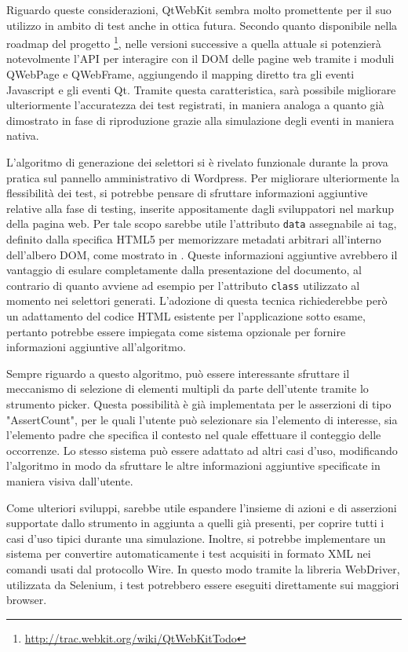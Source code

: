 \documentclass[12pt]{toptesi}
\begin{document}
Riguardo queste considerazioni, QtWebKit sembra molto promettente per il suo utilizzo in ambito di test anche in ottica futura. Secondo quanto disponibile nella roadmap del progetto \footnote{\url{http://trac.webkit.org/wiki/QtWebKitTodo}}, nelle versioni successive a quella attuale si potenzierà notevolmente l'API per interagire con il DOM delle pagine web tramite i moduli QWebPage e QWebFrame, aggiungendo il mapping diretto tra gli eventi Javascript e gli eventi Qt. Tramite questa caratteristica, sarà possibile migliorare ulteriormente l'accuratezza dei test registrati, in maniera analoga a quanto già dimostrato in fase di riproduzione grazie alla simulazione degli eventi in maniera nativa.

L'algoritmo di generazione dei selettori si è rivelato funzionale durante la prova pratica sul pannello amministrativo di Wordpress. Per migliorare ulteriormente la flessibilità dei test, si potrebbe pensare di sfruttare informazioni aggiuntive relative alla fase di testing, inserite appositamente dagli sviluppatori nel markup della pagina web. Per tale scopo sarebbe utile l'attributo \verb|data| assegnabile ai tag, definito dalla specifica HTML5 per memorizzare metadati arbitrari all'interno dell'albero DOM, come mostrato in \cite{html5Data}. Queste informazioni aggiuntive avrebbero il vantaggio di esulare completamente dalla presentazione del documento, al contrario di quanto avviene ad esempio per l'attributo \verb|class| utilizzato al momento nei selettori generati. L'adozione di questa tecnica richiederebbe però un adattamento del codice HTML esistente per l'applicazione sotto esame, pertanto potrebbe essere impiegata come sistema opzionale per fornire informazioni aggiuntive all'algoritmo.

Sempre riguardo a questo algoritmo, può essere interessante sfruttare il meccanismo di selezione di elementi multipli da parte dell'utente tramite lo strumento picker. Questa possibilità è già implementata per le asserzioni di tipo "AssertCount", per le quali l'utente può selezionare sia l'elemento di interesse, sia l'elemento padre che specifica il contesto nel quale effettuare il conteggio delle occorrenze. Lo stesso sistema può essere adattato ad altri casi d'uso, modificando l'algoritmo in modo da sfruttare le altre informazioni aggiuntive specificate in maniera visiva dall'utente.  

Come ulteriori sviluppi, sarebbe utile espandere l'insieme di azioni e di asserzioni supportate dallo strumento in aggiunta a quelli già presenti, per coprire tutti i casi d'uso tipici durante una simulazione. Inoltre, si potrebbe implementare un sistema per convertire automaticamente i test acquisiti in formato XML nei comandi usati dal protocollo Wire. In questo modo tramite la libreria WebDriver, utilizzata da Selenium, i test potrebbero essere eseguiti direttamente sui maggiori browser. 



\end{document}
